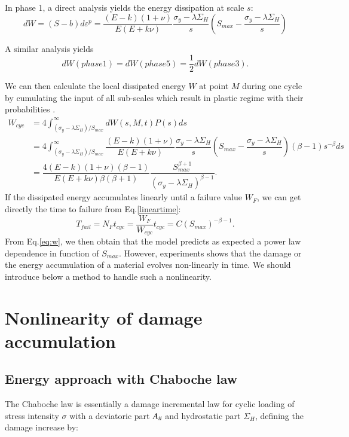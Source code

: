 \documentclass[3p,times,number,review]{elsarticle}
\begin{document}
In phase 1, a direct analysis yields the energy dissipation at scale $s$:
\begin{equation}dW=(S-b)d\varepsilon^p=\dfrac{(E-k)(1+\nu) }{E(E+k\nu)}\dfrac{\sigma_y-\lambda \Sigma_H}{s}\left(S_{max}-\dfrac{\sigma_y-\lambda \Sigma_H}{s}\right)
\label{dw}
\end{equation}

A similar analysis yields $$dW(phase 1)=dW(phase 5)=\dfrac{1}{2}dW(phase 3).$$

We can then calculate  the local dissipated energy $W$  at point $M$ during one cycle by cumulating the input of all sub-scales which result in plastic regime with their probabilities \cite{zepeng}.
\begin{equation}
\begin{split}
W_{cyc}&=4\int_{\left( \sigma_y-\lambda \Sigma_H\right) /S_{max}}^{\infty}dW(s,M,t)P(s)ds
\\&=4\int_{\left( \sigma_y-\lambda \Sigma_H\right) /S_{max}}^{\infty}\dfrac{(E-k)(1+\nu) }{E(E+k\nu)}\dfrac{\sigma_y-\lambda \Sigma_H}{s}\left(S_{max}-\dfrac{\sigma_y-\lambda \Sigma_H}{s}\right)\left( \beta-1\right) s^{-\beta}ds
\\&=\dfrac{4(E-k)(1+\nu)\left( \beta-1\right) }{ E(E+k\nu)\beta\left( \beta+1\right) }\dfrac{S_{max}^{\beta+1}}{\left( \sigma_y-\lambda \Sigma_H\right) ^{\beta-1}}.
\end{split}
\label{eq:w}
\end{equation}
 If the dissipated energy accumulates linearly until a failure value $W_F$, we can get directly the time to failure from Eq.\eqref{lineartime}:
\begin{equation}
T_{fail}=N_{F}t_{cyc}=\dfrac{W_F}{W_{cyc}}t_{cyc}=C(S_{max})^{-\beta-1}.
\label{lineartime}
\end{equation}
From Eq.\eqref{eq:w}, we then obtain that the model predicts as expected a power law dependence in function of $S_{max}$.
However, experiments shows that the damage or the energy accumulation of a material evolves non-linearly in time. We should introduce below a method to handle such a nonlinearity.

\section{Nonlinearity of damage accumulation}
\subsection{Energy approach with Chaboche law}
The Chaboche law\cite{lemaitre1990mechanics} is essentially a damage incremental law for cyclic loading of stress intensity $\sigma$ with a deviatoric part ${A}_{\uppercase\expandafter{\romannumeral2}}$ and hydrostatic part $\Sigma_H$, defining the damage increase by:
\end{document}
